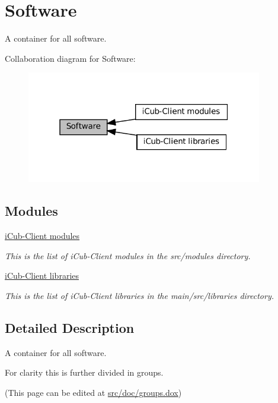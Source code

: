 \hypertarget{group__icubclient__software__all}{}\section{Software}
\label{group__icubclient__software__all}


A container for all software.  


Collaboration diagram for Software\+:
\nopagebreak
\begin{figure}[H]
\begin{center}
\leavevmode
\includegraphics[width=292pt]{group__icubclient__software__all}
\end{center}
\end{figure}
\subsection*{Modules}
\begin{DoxyCompactItemize}
\item 
\hyperlink{group__icubclient__modules}{i\+Cub-\/\+Client modules}
\begin{DoxyCompactList}\small\item\em This is the list of i\+Cub-\/\+Client modules in the src/modules directory. \end{DoxyCompactList}\item 
\hyperlink{group__icubclient__libraries}{i\+Cub-\/\+Client libraries}
\begin{DoxyCompactList}\small\item\em This is the list of i\+Cub-\/\+Client libraries in the main/src/libraries directory. \end{DoxyCompactList}\end{DoxyCompactItemize}


\subsection{Detailed Description}
A container for all software. 

For clarity this is further divided in groups.

(This page can be edited at \hyperlink{groups_8dox}{src/doc/groups.\+dox}) 